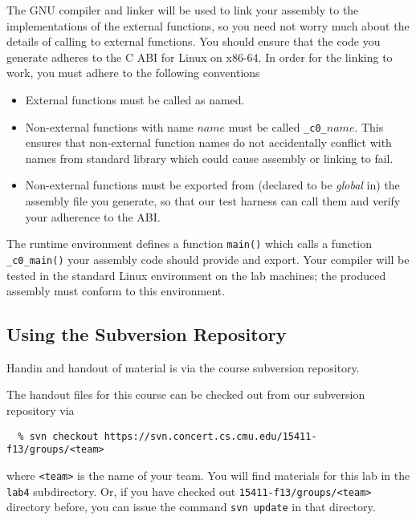 \documentclass[11pt]{article}
\begin{document}
The GNU compiler and linker will be used to link your assembly to the
implementations of the external functions, so you need not worry much
about the details of calling to external functions. You should ensure
that the code you generate adheres to the C ABI for Linux on
x86-64.  In order for the linking to work, you must adhere to the
following conventions
\begin{itemize}
\item External functions must be called as named.
\item Non-external functions with name $\mathit{name}$ must be called
  \verb'_c0_'$\mathit{name}$.  This ensures that non-external function
  names do not accidentally conflict with names from standard library
  which could cause assembly or linking to fail.
\item Non-external functions must be exported from (declared to be
  \emph{global} in) the assembly file you generate, so that our test
  harness can call them and verify your adherence to the ABI.
\end{itemize}

The runtime environment defines a function \verb"main()" which calls a
function \verb"_c0_main()" your assembly code should provide and export.  Your
compiler will be tested in the standard Linux environment on the lab machines;
the produced assembly must conform to this environment.

\subsection*{Using the Subversion Repository}

Handin and handout of material is via the course subversion
repository.

The handout files for this course can be checked out from our
subversion repository via
\begin{verbatim}
  % svn checkout https://svn.concert.cs.cmu.edu/15411-f13/groups/<team>
\end{verbatim}
where \verb"<team>" is the name of your team.  You will find materials
for this lab in the \verb"lab4" subdirectory.  Or, if you have checked
out \verb"15411-f13/groups/<team>" directory before, you can issue the
command \verb"svn update" in that directory.
\end{document}
